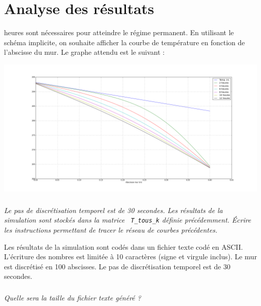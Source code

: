 \else



%



\fi

\section{Analyse des résultats}

\ifprof
{} heures sont nécessaires pour atteindre le régime permanent. En utilisant le schéma implicite, on souhaite afficher 
la courbe de température en fonction de l'abscisse du mur. Le graphe attendu est le suivant :

\begin{center}
\includegraphics[width=\linewidth]{images/figure_04}
\end{center}


\subparagraph{}
\textit{Le pas de discrétisation temporel est de 30 secondes. Les résultats de la simulation sont stockés dans la 
matrice  \texttt{ T\_tous\_k}  définie précédemment. Écrire les instructions permettant de tracer le réseau de courbes 
précédentes.}

\vspace{.5cm}

Les résultats de la simulation sont codés dans un fichier texte codé en ASCII. L'écriture des nombres est limitée à 10 caractères (signe et virgule inclus). 
Le mur est discrétisé en 100 abscisses. Le pas de discrétisation temporel est de 30 secondes. 


\subparagraph{}
\textit{Quelle sera la taille du fichier texte généré ?}
\fi

